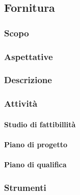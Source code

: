 
\subsection{Fornitura}

	\subsubsection{Scopo}

	\subsubsection{Aspettative}

	\subsubsection{Descrizione}

	\subsubsection{Attività}

		\paragraph{Studio di fattibillità}

		\paragraph{Piano di progetto}

		\paragraph{Piano di qualifica}

	\subsubsection{Strumenti}

